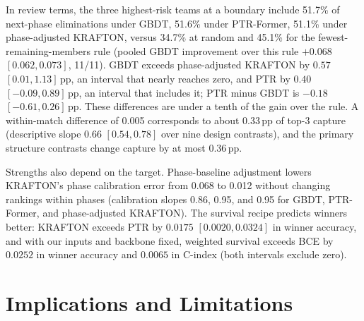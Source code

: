 \documentclass[sigconf,anonymous,nonacm]{acmart}
\begin{document}
In review terms, the three highest-risk teams at a boundary include 51.7\% of next-phase eliminations under GBDT, 51.6\% under PTR-Former, 51.1\% under phase-adjusted KRAFTON, versus 34.7\% at random and 45.1\% for the fewest-remaining-members rule (pooled GBDT improvement over this rule $+0.068$ $[0.062,\allowbreak 0.073]$, 11/11). GBDT exceeds phase-adjusted KRAFTON by $0.57$ $[0.01,\allowbreak 1.13]$\,pp, an interval that nearly reaches zero, and PTR by $0.40$ $[-0.09,\allowbreak 0.89]$\,pp, an interval that includes it; PTR minus GBDT is $-0.18$ $[-0.61,\allowbreak 0.26]$\,pp. These differences are under a tenth of the gain over the rule. A within-match difference of 0.005 corresponds to about 0.33\,pp of top-3 capture (descriptive slope 0.66 $[0.54,\allowbreak 0.78]$ over nine design contrasts), and the primary structure contrasts change capture by at most 0.36\,pp.

Strengths also depend on the target. Phase-baseline adjustment lowers KRAFTON's phase calibration error from 0.068 to 0.012 without changing rankings within phases (calibration slopes 0.86, 0.95, and 0.95 for GBDT, PTR-Former, and phase-adjusted KRAFTON). The survival recipe predicts winners better: KRAFTON exceeds PTR by $0.0175$ $[0.0020,\allowbreak 0.0324]$ in winner accuracy, and with our inputs and backbone fixed, weighted survival exceeds BCE by $0.0252$ in winner accuracy and $0.0065$ in C-index (both intervals exclude zero).


\section{Implications and Limitations}
\label{sec:discussion}
\end{document}
